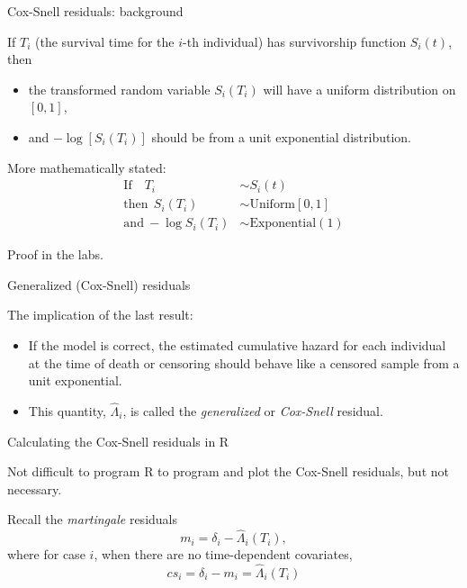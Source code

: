 \documentclass[ignorenonframetext,]{beamer}
\begin{document}
\begin{frame}{%
\protect\hypertarget{cox-snell-residuals-background}{%
Cox-Snell residuals: background}}

If \(T_i\) (the survival time for the \(i\)-th individual) has
survivorship function \(S_i(t)\), then

\begin{itemize}
\item
  the transformed random variable \(S_i(T_i)\) will have a uniform
  distribution on \([0,1]\),
\item
  and \(-\log[S_i(T_i)]\) should be from a unit exponential
  distribution.
\end{itemize}

More mathematically stated: \begin{align*}
\mbox{If ~~} T_i  &\sim S_i(t)\\
\mbox{then}~~ S_i(T_i) &\sim  \text{Uniform}[0,1]\\
\mbox{and}~ -\log S_i(T_i) &\sim \text{Exponential}(1)
\end{align*}

Proof in the labs.

\end{frame}

\begin{frame}{%
\protect\hypertarget{generalized-cox-snell-residuals}{%
Generalized (Cox-Snell) residuals}}

The implication of the last result:

\begin{itemize}
\item
  If the model is correct, the estimated cumulative hazard for each
  individual at the time of death or censoring should behave like a
  censored sample from a unit exponential.
\item
  This quantity, \(\widehat{\Lambda}_i\), is called the
  \emph{generalized} or \emph{Cox-Snell} residual.
\end{itemize}

\end{frame}

\begin{frame}{%
\protect\hypertarget{calculating-the-cox-snell-residuals-in-r}{%
Calculating the Cox-Snell residuals in R}}

Not difficult to program \textsf{R} to program and plot the Cox-Snell
residuals, but not necessary.

Recall the \emph{martingale} residuals
\[m_i = \delta_i - \widehat{\Lambda}_i(T_i),\] where for case \(i\),
when there are no time-dependent covariates,
\[cs_i = \delta_i - m_i = \widehat{\Lambda}_i(T_i) \]

\end{frame}
\end{document}

